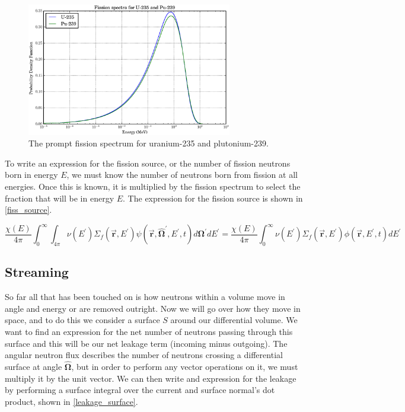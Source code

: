 \begin{figure}[h!] 
  \centering
    \includegraphics[width=0.8\textwidth ]{graphics/fiss_spec.eps} 
     \caption{The prompt fission spectrum for uranium-235 and plutonium-239. \label{fiss_spec}}
\end{figure}

To write an expression for the fission source, or the number of fission neutrons born in energy $E$, we must know the number of neutrons born from fission at all energies.  Once this is known, it is multiplied by the fission spectrum to select the fraction that will be in energy $E$.  The expression for the fission source is shown in \eqref{fiss_source}.

\begin{equation}
\label{fiss_source}
\frac{\chi(E)}{4\pi} \int_0^\infty  \int_{4\pi}   \nu(E^\prime) \Sigma_f(\boldsymbol{\vec{r}},E^\prime) \psi(\boldsymbol{\vec{r}},\boldsymbol{\hat{\Omega}}^\prime,E^\prime,t) d\boldsymbol{\Omega}^\prime  dE^\prime = \frac{\chi(E)}{4\pi} \int_0^\infty   \nu(E^\prime) \Sigma_f(\boldsymbol{\vec{r}},E^\prime) \phi(\boldsymbol{\vec{r}},E^\prime,t)  dE^\prime
 \end{equation}


\subsection{Streaming}

So far all that has been  touched on is how neutrons within a volume move in angle and energy or are removed outright.  Now we will go over how they move in space, and to do this we consider a surface $S$ around our differential volume.  We want to find an expression for the net number of neutrons passing through this surface and this will be our net leakage term (incoming minus outgoing).  The angular neutron flux describes the number of neutrons crossing a differential surface at angle $\boldsymbol{\hat{\Omega}}$, but in order to perform any vector operations on it, we must multiply it by the unit vector.  We can then write and expression for the leakage by performing a surface integral over the current and surface normal's dot product, shown in \eqref{leakage_surface}.

